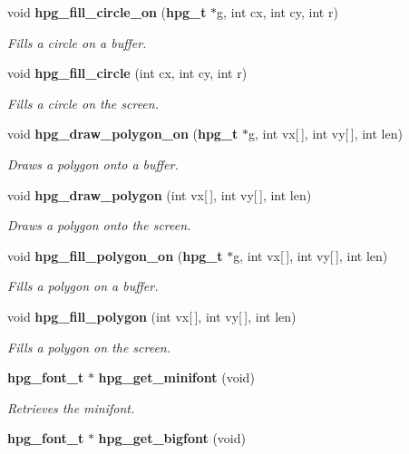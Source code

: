 \begin{CompactItemize}
void {\bf hpg\_\-fill\_\-circle\_\-on} ({\bf hpg\_\-t} $\ast$g, int cx, int cy, int r)
\begin{CompactList}\small\item\em Fills a circle on a buffer.\item\end{CompactList}\item 
void {\bf hpg\_\-fill\_\-circle} (int cx, int cy, int r)
\begin{CompactList}\small\item\em Fills a circle on the screen.\item\end{CompactList}\item 
void {\bf hpg\_\-draw\_\-polygon\_\-on} ({\bf hpg\_\-t} $\ast$g, int vx[$\,$], int vy[$\,$], int len)
\begin{CompactList}\small\item\em Draws a polygon onto a buffer.\item\end{CompactList}\item 
void {\bf hpg\_\-draw\_\-polygon} (int vx[$\,$], int vy[$\,$], int len)
\begin{CompactList}\small\item\em Draws a polygon onto the screen.\item\end{CompactList}\item 
void {\bf hpg\_\-fill\_\-polygon\_\-on} ({\bf hpg\_\-t} $\ast$g, int vx[$\,$], int vy[$\,$], int len)
\begin{CompactList}\small\item\em Fills a polygon on a buffer.\item\end{CompactList}\item 
void {\bf hpg\_\-fill\_\-polygon} (int vx[$\,$], int vy[$\,$], int len)
\begin{CompactList}\small\item\em Fills a polygon on the screen.\item\end{CompactList}\item 
{\bf hpg\_\-font\_\-t} $\ast$ {\bf hpg\_\-get\_\-minifont} (void)
\begin{CompactList}\small\item\em Retrieves the minifont.\item\end{CompactList}\item 
{\bf hpg\_\-font\_\-t} $\ast$ {\bf hpg\_\-get\_\-bigfont} (void)

\end{CompactItemize}
